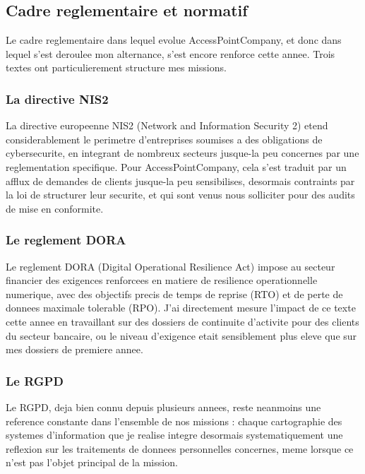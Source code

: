 \documentclass[11pt,a4paper]{article}
\begin{document}
\subsection{Cadre reglementaire et normatif}

Le cadre reglementaire dans lequel evolue AccessPointCompany, et donc dans lequel s'est deroulee mon alternance, s'est encore renforce cette annee. Trois textes ont particulierement structure mes missions.

\subsubsection*{La directive NIS2}

La directive europeenne NIS2 (Network and Information Security 2) etend considerablement le perimetre d'entreprises soumises a des obligations de cybersecurite, en integrant de nombreux secteurs jusque-la peu concernes par une reglementation specifique. Pour AccessPointCompany, cela s'est traduit par un afflux de demandes de clients jusque-la peu sensibilises, desormais contraints par la loi de structurer leur securite, et qui sont venus nous solliciter pour des audits de mise en conformite.

\subsubsection*{Le reglement DORA}

Le reglement DORA (Digital Operational Resilience Act) impose au secteur financier des exigences renforcees en matiere de resilience operationnelle numerique, avec des objectifs precis de temps de reprise (RTO) et de perte de donnees maximale tolerable (RPO). J'ai directement mesure l'impact de ce texte cette annee en travaillant sur des dossiers de continuite d'activite pour des clients du secteur bancaire, ou le niveau d'exigence etait sensiblement plus eleve que sur mes dossiers de premiere annee.

\subsubsection*{Le RGPD}

Le RGPD, deja bien connu depuis plusieurs annees, reste neanmoins une reference constante dans l'ensemble de nos missions : chaque cartographie des systemes d'information que je realise integre desormais systematiquement une reflexion sur les traitements de donnees personnelles concernes, meme lorsque ce n'est pas l'objet principal de la mission.
\end{document}
